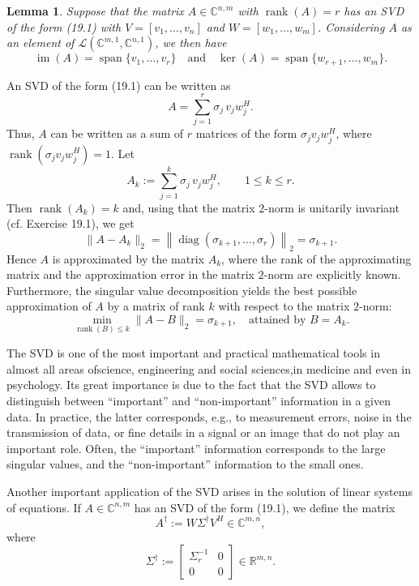 \documentclass{article}
\newtheorem{lemma}{Lemma}[section]
\begin{document}
\begin{lemma}
Suppose that the matrix $A \in \mathbb{C}^{n,m}$ with $\operatorname{rank}(A)=r$ has an SVD of the form (19.1) with $V = [v_1,\dots,v_n]$ and $W = [w_1,\dots,w_m]$.
Considering $A$ as an element of $\mathcal{L}(\mathbb{C}^{m,1}, \mathbb{C}^{n,1})$, we then have
\[
\operatorname{im}(A) = \operatorname{span}\{v_1,\dots,v_r\}
\quad\text{and}\quad
\ker(A) = \operatorname{span}\{w_{r+1},\dots,w_m\}.
\]
\end{lemma}

\vspace{2cm}

An SVD of the form (19.1) can be written as
\[
A = \sum_{j=1}^r \sigma_j\, v_j w_j^H.
\]
Thus, $A$ can be written as a sum of $r$ matrices of the form $\sigma_j v_j w_j^H$, where
$\operatorname{rank}(\sigma_j v_j w_j^H)=1$. Let
\[
A_k := \sum_{j=1}^k \sigma_j\, v_j w_j^H, \qquad 1 \le k \le r.
\tag{19.2}
\]
Then $\operatorname{rank}(A_k)=k$ and, using that the matrix $2$-norm is unitarily invariant (cf. Exercise 19.1), we get
\[
\|A - A_k\|_2
= \left\| \operatorname{diag}(\sigma_{k+1},\dots,\sigma_r) \right\|_2
= \sigma_{k+1}.
\tag{19.3}
\]
Hence $A$ is approximated by the matrix $A_k$, where the rank of the approximating
matrix and the approximation error in the matrix $2$-norm are explicitly known.
Furthermore, the singular value decomposition yields the best possible approximation
of $A$ by a matrix of rank $k$ with respect to the matrix $2$-norm:
\[
\min_{\operatorname{rank}(B)\le k} \|A - B\|_2 = \sigma_{k+1},
\quad\text{attained by } B = A_k.
\]

\vspace{1cm}

The SVD is one of the most important and practical mathematical tools in almost all areas ofscience, engineering and social sciences,in medicine and even in psychology. Its great importance is due to the fact that the SVD allows to distinguish between “important” and “non-important” information in a given data. In practice, the latter corresponds, e.g., to measurement errors, noise in the transmission of data, or fine details in a signal or an image that do not play an important role. Often, the “important” information corresponds to the large singular values, and the “non-important” information to the small ones.

\vspace{1cm}

Another important application of the SVD arises in the solution of linear systems
of equations. If $A \in \mathbb{C}^{n,m}$ has an SVD of the form (19.1), we define the matrix
\[
A^{\dagger} := W \Sigma^{\dagger} V^H \in \mathbb{C}^{m,n},
\]
where
\[
\Sigma^{\dagger} := 
\begin{bmatrix}
\Sigma_r^{-1} & 0 \\
0 & 0
\end{bmatrix}
\in \mathbb{R}^{m,n}.
\]
\end{document}
